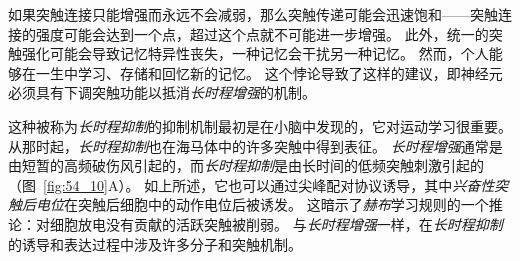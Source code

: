 如果突触连接只能增强而永远不会减弱，那么突触传递可能会迅速饱和——突触连接的强度可能会达到一个点，超过这个点就不可能进一步增强。
此外，统一的突触强化可能会导致记忆特异性丧失，一种记忆会干扰另一种记忆。
然而，个人能够在一生中学习、存储和回忆新的记忆。
这个悖论导致了这样的建议，即神经元必须具有下调突触功能以抵消\textit{长时程增强}的机制。


这种被称为\textit{长时程抑制}的抑制机制最初是在小脑中发现的，它对运动学习很重要。
从那时起，\textit{长时程抑制}也在海马体中的许多突触中得到表征。
\textit{长时程增强}通常是由短暂的高频破伤风引起的，而\textit{长时程抑制}是由长时间的低频突触刺激引起的（图~\ref{fig:54_10}A）。
如上所述，它也可以通过尖峰配对协议诱导，其中\textit{兴奋性突触后电位}在突触后细胞中的动作电位后被诱发。
这暗示了\textit{赫布}学习规则的一个推论：对细胞放电没有贡献的活跃突触被削弱。
与\textit{长时程增强}一样，在\textit{长时程抑制}的诱导和表达过程中涉及许多分子和突触机制。


